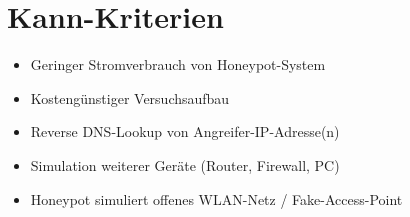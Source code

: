 \section{Kann-Kriterien}
\label{sec:Kann-Kriterien}
\begin{itemize}
\item Geringer Stromverbrauch von Honeypot-System
\item Kostengünstiger Versuchsaufbau
\item Reverse DNS-Lookup von Angreifer-IP-Adresse(n)
\item Simulation weiterer Geräte (Router, Firewall, PC)
\item Honeypot simuliert offenes WLAN-Netz / Fake-Access-Point
\end{itemize}


